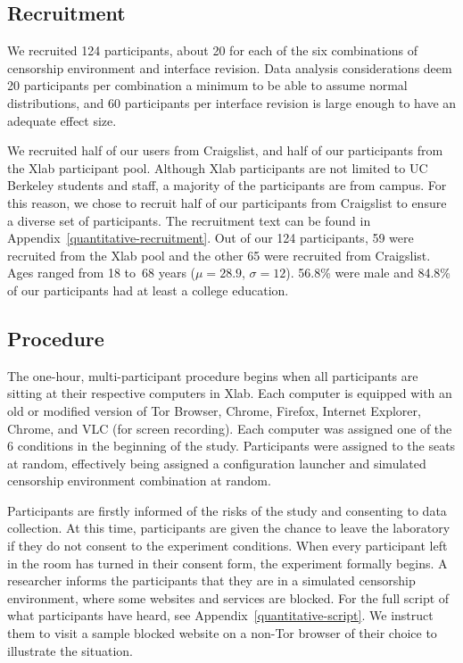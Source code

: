 \documentclass[USenglish,oneside,twocolumn]{article}
\begin{document}
\subsection{Recruitment}
We recruited 124 participants, about 20 for each
of the six combinations of censorship environment
and interface revision.
Data analysis considerations deem 20 participants per combination a 
minimum to be able to assume normal distributions, and 60 participants
per interface revision is large enough to have an adequate effect size.

We recruited half of our users from Craigslist, and half of our participants from 
the Xlab participant pool. Although Xlab participants are not limited to UC Berkeley students and staff,
a majority of the participants are from campus. For this reason, we chose to recruit 
half of our participants from Craigslist to ensure a diverse set of participants. 
The recruitment text can be found in Appendix~\ref{quantitative-recruitment}. 
Out of our 124 participants, 59 were recruited from the Xlab pool and the other 65 were
recruited from Craigslist. Ages ranged from 18 to~68 years
($\mu = 28.9$, $\sigma = 12$). 56.8\% were male and 
84.8\% of our participants had at least a college education.

\subsection{Procedure}
The one-hour, multi-participant procedure begins when all participants are sitting at their
respective computers in Xlab. Each computer is equipped with an old or modified version
of Tor Browser, Chrome, Firefox, Internet Explorer,  Chrome, and VLC (for screen recording).
Each computer was assigned one of the 6 conditions in the beginning of the study. Participants
were assigned to the seats at random, effectively being assigned a configuration launcher and
simulated censorship environment combination at random. 

Participants are firstly informed of the risks of the study and consenting to data collection.  At
this time, participants are given the chance to leave the laboratory if they do not consent to 
the experiment conditions. When every participant left in the room has turned in their consent
form, the experiment formally begins. A researcher informs the participants that they are in a
simulated censorship environment, where some websites and services are blocked. 
For the full script of what participants have heard, see Appendix~\ref{quantitative-script}. We
instruct them to visit a sample blocked website on a non-Tor browser of their choice to illustrate 
the situation.
\end{document}

